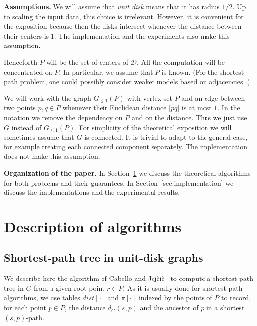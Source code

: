 \documentclass[a4paper,USenglish]{lipics}
\newcommand{\D}{\ensuremath{\mathcal{D}}}
\newcommand{\GG}{\ensuremath{G_{\le 1}}}
\def\dist{\mathit{dist}}
\let\le\leqslant
\def\myparagraph#1{\medskip\noindent\textbf{#1.}}
\begin{document}
\myparagraph{Assumptions} 
We will assume that \emph{unit disk} means that it has radius $1/2$. 
Up to scaling the input data, this choice is irrelevant.
However, it is convenient for the exposition
because then the disks intersect whenever 
the distance between their centers is $1$. 
The implementation and the experiments also make this assumption.

Henceforth $P$ will be the set of centers of $\D$. 
All the computation will be concentrated on $P$. 
In particular, we assume that $P$ is known.
(For the shortest path problem, one could possibly consider weaker models based 
on adjacencies. )

We will work with the graph $\GG(P)$ with vertex set $P$ 
and an edge between two points $p,q\in P$ 
whenever their Euclidean distance $|pq|$ is at most $1$. 
In the notation we remove the dependency on $P$ and on the distance.
Thus we just use $G$ instead of $\GG(P)$.
For simplicity of the theoretical 
exposition we will sometimes assume that $G$ is connected.
It is trivial to adapt to the general case, for example
treating each connected component separately.
The implementation does not make this assumption.

\myparagraph{Organization of the paper} 
In Section~\ref{sec:algorithms} we discuss the theoretical
algorithms for both problems and their guarantees.
In Section~\ref{sec:implementation} we discuss the implementations 
and the experimental results.

\section{Description of algorithms}
\label{sec:algorithms}

\subsection{Shortest-path tree in unit-disk graphs}
\label{sec:algorithm-sptree}
We describe here the algorithm of Cabello and Jej\v{c}i\v{c}~\cite{CJ15} 
to compute a shortest path tree in $G$ from a given root point $r\in P$. 
As it is usually done for shortest path algorithms, 
we use tables $\dist[\cdot]$ and $\pi[\cdot]$ indexed by the points of $P$ to record, 
for each point $p\in P$, the distance $d_{G}(s,p)$ and the ancestor of $p$ 
in a shortest $(s,p)$-path. 
\end{document}
